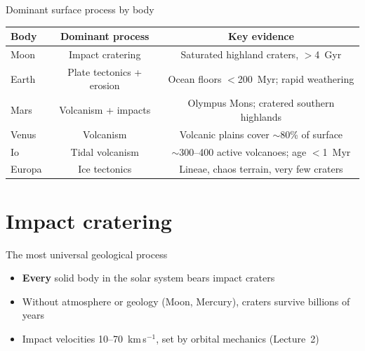 \documentclass[aspectratio=169, 11pt]{beamer}
\begin{document}
\begin{frame}{Dominant surface process by body}
  \centering
  \small
  \begin{tabular}{l c c}
    \toprule
    \textbf{Body} & \textbf{Dominant process} & \textbf{Key evidence} \\
    \midrule
    Moon   & Impact cratering & Saturated highland craters, $>$4~Gyr \\
    Earth  & Plate tectonics + erosion & Ocean floors $<$200~Myr; rapid weathering \\
    Mars   & Volcanism + impacts & Olympus Mons; cratered southern highlands \\
    Venus  & Volcanism & Volcanic plains cover $\sim$80\% of surface \\
    Io     & Tidal volcanism & $\sim$300--400 active volcanoes; age $<$1~Myr \\
    Europa & Ice tectonics & Lineae, chaos terrain, very few craters \\
    \bottomrule
  \end{tabular}
\end{frame}

\begin{frame}
\end{frame}

\section{Impact cratering}

\begin{frame}{The most universal geological process}
  \begin{itemize}\setlength\itemsep{4pt}
    \item \textbf{Every} solid body in the solar system bears impact craters
    \item Without atmosphere or geology (Moon, Mercury), craters survive billions of years
    \item Impact velocities 10--70~km\,s$^{-1}$, set by orbital mechanics (Lecture~2)
  \end{itemize}
  \vskip8pt
\end{frame}
\end{document}

